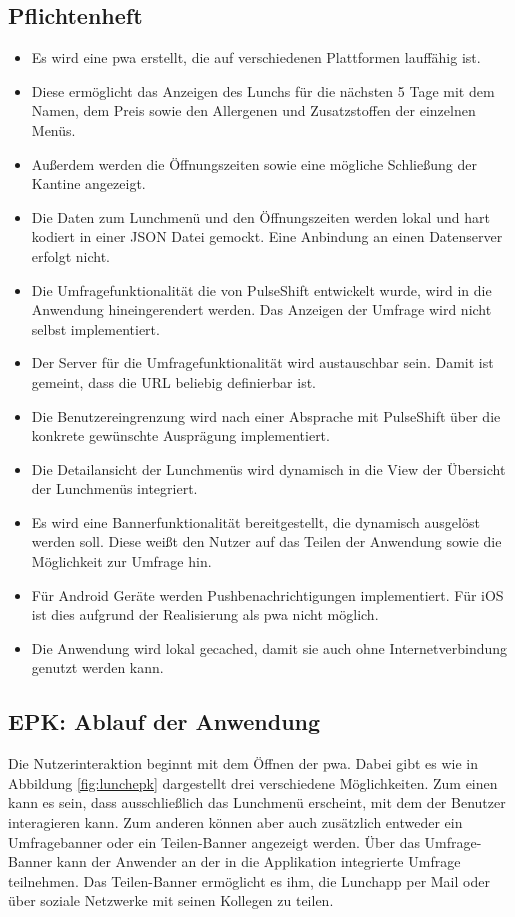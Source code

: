 \subsection{Pflichtenheft}

\begin{itemize}
\item Es wird eine \gls{pwa} erstellt, die auf verschiedenen Plattformen lauffähig ist. 
\item Diese ermöglicht das Anzeigen des Lunchs für die nächsten 5 Tage mit dem Namen, dem Preis sowie den Allergenen und Zusatzstoffen der einzelnen Menüs. 
\item Außerdem werden die Öffnungszeiten sowie eine mögliche Schließung der Kantine angezeigt.
\item Die Daten zum Lunchmenü und den Öffnungszeiten werden lokal und hart kodiert in einer JSON Datei gemockt. Eine Anbindung an einen Datenserver erfolgt nicht. 
\item Die Umfragefunktionalität die von PulseShift entwickelt wurde, wird in die Anwendung hineingerendert werden. Das Anzeigen der Umfrage wird nicht selbst implementiert. 
\item Der Server für die Umfragefunktionalität wird austauschbar sein. Damit ist gemeint, dass die URL beliebig definierbar ist.
\item Die Benutzereingrenzung wird nach einer Absprache mit PulseShift über die konkrete gewünschte Ausprägung implementiert.
\item Die Detailansicht der Lunchmenüs wird dynamisch in die View der Übersicht der Lunchmenüs integriert.
\item Es wird eine Bannerfunktionalität bereitgestellt, die dynamisch ausgelöst werden soll. Diese weißt den Nutzer auf das Teilen der Anwendung sowie die Möglichkeit zur Umfrage hin.
\item Für Android Geräte werden Pushbenachrichtigungen implementiert. Für iOS ist dies aufgrund der Realisierung als \gls{pwa} nicht möglich.
\item Die Anwendung wird lokal gecached, damit sie auch ohne Internetverbindung genutzt werden kann.
\end{itemize}

\subsection{EPK: Ablauf der Anwendung}

Die Nutzerinteraktion beginnt mit dem Öffnen der \gls{pwa}. Dabei gibt es wie in Abbildung \ref{fig:lunchepk} dargestellt drei verschiedene Möglichkeiten. Zum einen kann es sein, dass ausschließlich das Lunchmenü erscheint, mit dem der Benutzer interagieren kann. Zum anderen können aber auch zusätzlich entweder ein Umfragebanner oder ein Teilen-Banner angezeigt werden. Über das Umfrage-Banner kann der Anwender an der in die Applikation integrierte Umfrage teilnehmen. Das Teilen-Banner ermöglicht es ihm, die Lunchapp per Mail oder über soziale Netzwerke mit seinen Kollegen zu teilen.

